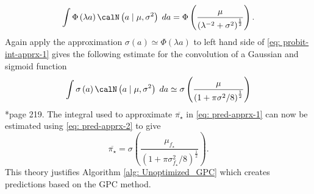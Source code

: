 \begin{equation} \label{eq: probit-int-apprx-1}
    \int \Phi \left( \lambda a \right) \calN \left( a \mid \mu , \sigma^2 \right) \; da = \Phi \left( \frac{\mu}{\left( \lambda^{-2} + \sigma^2 \right)^{\frac{1}{2}}} \right).
\end{equation}
Again apply the approximation $\sigma \left( a \right) \simeq \Phi \left( \lambda a \right)$ to left hand side of \ref{eq: probit-int-apprx-1} gives the following estimate for the convolution of a Gaussian and sigmoid function
\begin{equation} \label{eq: pred-apprx-2}
    \int \sigma \left( a \right) \calN \left( a \mid \mu , \sigma^2 \right) \; da \simeq \sigma \left( \frac{\mu}{\left( 1 + \pi \sigma^2 / 8 \right)^{\frac{1}{2}}} \right)
\end{equation}
\cite{BishopChristopherM2006Pram}*{page 219}. The integral used to approximate $\overline{\pi_{\star}}$ in \ref{eq: pred-apprx-1} can now be estimated using \ref{eq: pred-apprx-2} to give
\begin{equation*} \label{eq: pred-apprx-3}
    \overline{\pi_{\star}} = \sigma \left( \frac{\mu_{f_{\star}}}{\left( 1 + \pi \sigma_{f_{\star}}^2 / 8 \right)^{\frac{1}{2}}} \right).
\end{equation*}
This theory justifies Algorithm \ref{alg: Unoptimized_GPC} which creates predictions based on the GPC method.

